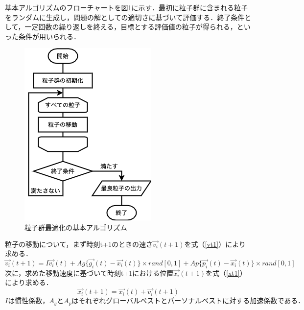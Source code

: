 基本アルゴリズムのフローチャートを図\ref{fig:04se}に示す．最初に粒子群に含まれる粒子をランダムに生成し，問題の解としての適切さに基づいて評価する．終了条件として，一定回数の繰り返しを終える，目標とする評価値の粒子が得られる，といった条件が用いられる．

\begin{figure}[tbp]
  \begin{center}
  \includegraphics[scale=0.8]{image/PSOalgorithm.png}
  \caption{粒子群最適化の基本アルゴリズム}
  \label{fig:04se}
  \end{center}
\end{figure}

粒子の移動について，まず時刻t+1のときの速さ\begin{math}
  \vec{v_{i}}(t+1)
\end{math}を式（\ref{vt1}）により求める．
\begin{equation}
  \label{vt1}
  \vec{v_{i}}(t+1) = I\vec{v_{i}}(t) + Ag\{ \vec{g_{i} }(t) - \vec{x_{i}}(t) \} \times rand[0,1] + Ap\{ \vec{p_{i} }(t) - \vec{ x_{i} }(t)\} \times rand[0,1]
\end{equation}
次に，求めた移動速度に基づいて時刻t+1における位置\begin{math}
  \vec{x_{i}}(t+1)
\end{math}を式（\ref{xt1}）により求める．
\begin{equation}
  \label{xt1}
  \vec{x_{i}}(t+1) = \vec{x_{i}}(t) + \vec{v_{i}}(t+1)
\end{equation}
\begin{math}
  Iは慣性係数，A_{g}とA_{p}はそれぞれグローバルベストとパーソナルベストに対する加速係数である．
\end{math}

